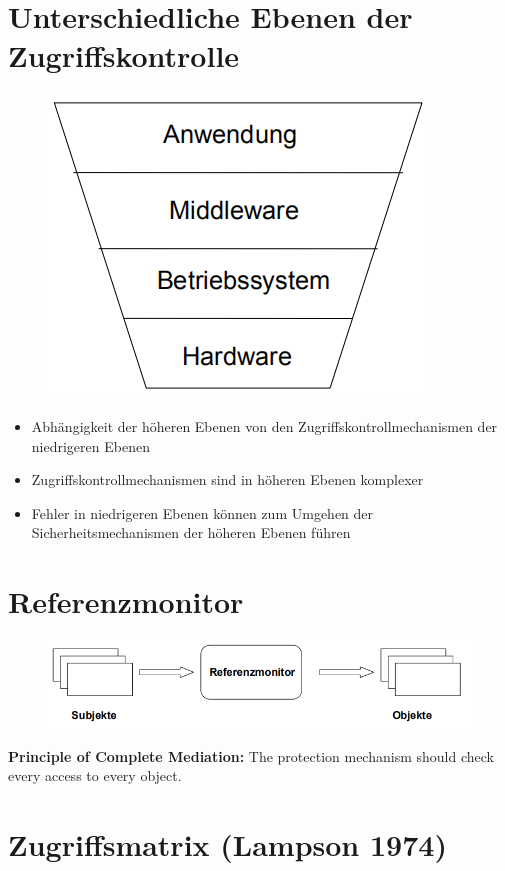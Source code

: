 \documentclass[openany]{book}
\begin{document}
\newpage
\section{Unterschiedliche Ebenen der Zugriffskontrolle}

\begin{figure}[h!]
\centering
\includegraphics[width=0.5\linewidth]{Pics/AccessControl.PNG}
\end{figure}

\begin{itemize}
\item Abhängigkeit der höheren Ebenen von den Zugriffskontrollmechanismen der niedrigeren Ebenen
\item Zugriffskontrollmechanismen sind in höheren Ebenen komplexer
\item Fehler in niedrigeren Ebenen können zum Umgehen der Sicherheitsmechanismen der höheren Ebenen führen
\end{itemize}

\section{Referenzmonitor}

\begin{figure}[h!]
\centering
\includegraphics[width=\linewidth]{Pics/ReferenceMonitor.PNG}
\end{figure}

\textbf{Principle of Complete Mediation:} The protection mechanism should check every access to every object.

\section{Zugriffsmatrix (Lampson 1974)} 
\end{document}
